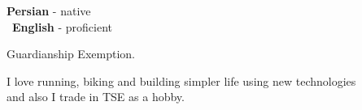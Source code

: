 \documentclass[9pt]{developercv}
\begin{document}

\begin{minipage}[t]{0.3\textwidth}
	\vspace{-\baselineskip} %


	\textbf{Persian} - native\\\
	\textbf{English} - proficient\\
\end{minipage}
\hfill
\begin{minipage}[t]{0.3\textwidth}
	\vspace{-\baselineskip} %


	Guardianship Exemption.
\end{minipage}
\hfill
\begin{minipage}[t]{0.3\textwidth}
	\vspace{-\baselineskip} %


	I love running, biking and building simpler life using new technologies\\
	and also I trade in TSE as a hobby.
\end{minipage}
\hfill
\end{document}

